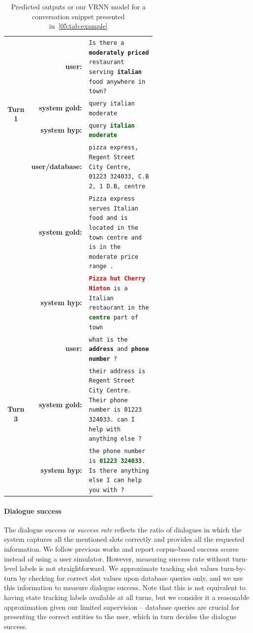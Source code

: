 \begin{table}[tp]
    \centering\scriptsize
    \begin{tabular}{crp{0.6\linewidth}}
        \toprule
         \multirow{4}{*}{\bf Turn 1}&\bf user:& \texttt{Is there a \textbf{moderately priced} restaurant serving \textbf{italian} food anywhere in town?} \\
         &\bf system gold: & \texttt{query italian moderate} \\
         &\bf system hyp: & \texttt{query \textbf{\textcolor{darkgreen}{italian moderate}}}  \\
         \midrule
        \multirow{4}{*}{\bf Turn 2}&\bf user/database:& \texttt{pizza express, Regent Street City Centre, 01223 324033, C.B 2, 1 D.B, centre}  \\
         &\bf system gold:& \texttt{Pizza express serves Italian food and is located in the town centre and is in the moderate price range .} \\        
        &\bf system hyp:& \texttt{\textbf{\textcolor{red}{Pizza hut Cherry Hinton}} is a Italian restaurant in the \textbf{\textcolor{darkgreen}{centre}} part of town} \\
         \midrule
        \multirow{4}{*}{\bf Turn 3}&\bf user:& \texttt{what is the \textbf{address} and \textbf{phone number} ?} \\
        &\bf system gold:& \texttt{their address is  Regent Street City Centre. Their phone number is 01223 324033. can I help with anything else ?} \\
        & \bf system hyp:& \texttt{the phone number is \textbf{\textcolor{darkgreen}{01223 324033}}. Is there anything else I can help you with ?} \\
        \bottomrule
    \end{tabular}
    \vspace{-2mm}
    \caption{Predicted outputs or our VRNN model for a conversation snippet presented in~\ref{05:tab:example}}
    \label{05:tab:example-cont}
\end{table}

\paragraph{Dialogue success}
The dialogue success or \emph{success rate} reflects the ratio of dialogues in which the system captures all the mentioned slots correctly and provides all the requested information.
We follow previous works \cite{nekvinda2021shades} and report corpus-based success scores instead of using a user simulator.
However, measuring success rate without turn-level labels is not straightforward.
We approximate tracking slot values turn-by-turn by checking for correct slot values upon database queries only, and we use this information to measure dialogue success.
Note that this is not equivalent to having state tracking labels available at all turns, but we consider it a reasonable approximation given our limited supervision -- database queries are crucial for presenting the correct entities to the user, which in turn decides the dialogue success.

